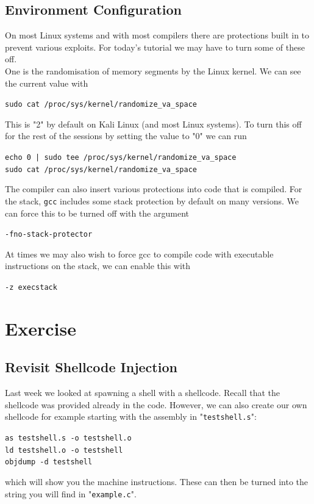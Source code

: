 \documentclass{article}
\begin{document}
\subsection{Environment Configuration}
On most Linux systems and with most compilers there are protections built
in to prevent various exploits. For today's tutorial we may have to turn some
of these off.\\

\noindent One is the randomisation of memory segments by the Linux kernel. We
can see the current value with
\begin{center}
    \lstinline{sudo cat /proc/sys/kernel/randomize_va_space}
\end{center}
\noindent This is "2" by default on Kali Linux (and most Linux systems). To turn this off for the rest of the sessions by setting the value to "0" we can run
\begin{center}
    \lstinline{echo 0 | sudo tee /proc/sys/kernel/randomize_va_space}\\
    \lstinline{sudo cat /proc/sys/kernel/randomize_va_space}
\end{center}
\noindent The compiler can also insert various protections into code that is compiled.
For the stack, \lstinline{gcc} includes some stack protection by default on many
versions. We can force this to be turned off with the argument
\begin{center}
    \lstinline{-fno-stack-protector}
\end{center}
\noindent At times we may also wish to force gcc to compile code with executable
instructions on the stack, we can enable this with
\begin{center}
    \lstinline{-z execstack}
\end{center}


\section{Exercise}
\subsection{Revisit Shellcode Injection}
Last week we looked at spawning a shell with a shellcode. Recall that the
shellcode was provided already in the code. However, we can also create our
own shellcode for example starting with the assembly in "\lstinline{testshell.s}":
\begin{center}
    \lstinline{as testshell.s -o testshell.o}\\
    \lstinline{ld testshell.o -o testshell}\\
    \lstinline{objdump -d testshell}
\end{center}
\noindent which will show you the machine instructions. These can then be turned into
the string you will find in "\lstinline{example.c}".\\
\end{document}
